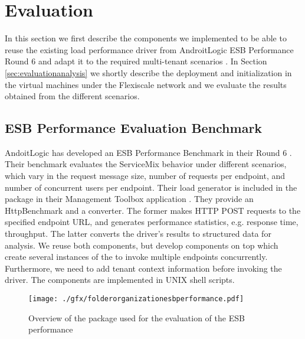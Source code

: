 \section{Evaluation}
\label{sec:evaluation}

In this section we first describe the components we implemented to be able to reuse the existing load performance driver from AndroitLogic \ac{ESB} Performance Round 6 and adapt it to the required multi-tenant scenarios \cite{androit2012}. In Section \ref{sec:evaluationanalysis} we shortly describe the deployment and initialization in the virtual machines under the Flexiscale network \cite{flexiscale} and we evaluate the results obtained from the different scenarios. 

\subsection{ESB Performance Evaluation Benchmark}

AndoitLogic has developed an ESB Performance Benchmark in their Round 6 \cite{androit2012}. Their benchmark evaluates the ServiceMix behavior under different scenarios, which vary in the request message size, number of requests per endpoint, and number of concurrent users per endpoint. Their load generator is included in the  package in their Management Toolbox application \cite{androit2012}. They provide an HttpBenchmark and a  converter. The former makes \ac{HTTP} POST requests to the specified endpoint URL, and generates performance statistics, e.g. response time, throughput. The latter converts the driver's results to structured data for analysis. We reuse both components, but develop components on top which create several instances of the  to invoke multiple endpoints concurrently. Furthermore, we need to add tenant context information before invoking the driver. The components are implemented in UNIX shell scripts.

\begin{figure}[htb]
	\centering
		\texttt{[image: ./gfx/folderorganizationesbperformance.pdf]}
	\caption[ESB Performance Evaluation Package Structure]{Overview of the package used for the evaluation of the \ac{ESB} performance}
	\label{fig:folderarch}
\end{figure}

